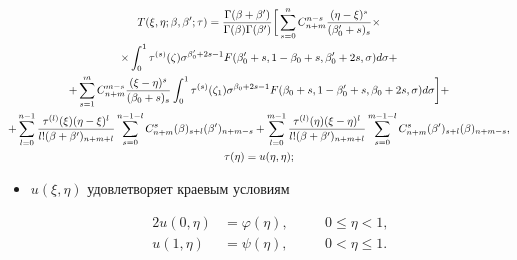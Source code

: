 \begin{gather} 


T(\xi,\eta;\beta,\beta';\tau)= 


\frac{\Gamma(\beta+\beta')}{\Gamma(\beta)\Gamma(\beta')}\bigg[ 


\sum^n_{s=0}C^{n-s}_{n+m}\frac{(\eta-\xi)^s}{(\beta'_0+s)_s} 


\times \notag \\ 


% 


\times\int^1_0 \tau^{(s)}(\zeta)\sigma^{\beta'_0+2s-1}F 


(\beta'_0+s,1-\beta_0+s,\beta'_0+2s,\sigma)d\sigma +\notag \\ 


% 


+\sum^m_{s=1}C^{m-s}_{n+m}\frac{(\xi-\eta)^s}{(\beta_0+s)_s} 


\int^1_0 \tau^{(s)}(\zeta_1)\sigma^{\beta_0+2s-1}F 


(\beta_0+s,1-\beta'_0+s,\beta_0+2s,\sigma)d\sigma\bigg] + \notag \\ 


% 


+\sum^{n-1}_{l=0}\frac{\tau^{(l)}(\xi)(\eta-\xi)^l} 


{l!(\beta+\beta')_{n+m+l}}\sum^{n-1-l}_{s=0} 


C^s_{n+m}(\beta)_{s+l}(\beta')_{n+m-s}+ 


\sum^{m-1}_{l=0}\frac{\tau^{(l)}(\eta)(\xi-\eta)^l} 


{l!(\beta+\beta')_{n+m+l}}\sum^{m-1-l}_{s=0} C^s_{n+m}


(\beta')_{s+l}(\beta)_{n+m-s},\notag \\ 


%


\tau(\eta)=u(\eta,\eta); 


\end{gather} 


\begin{itemize} 


\item[4)] $u(\xi,\eta)$ удовлетворяет краевым условиям 


\begin{alignat}{2} 


u(0,\eta)&=\varphi(\eta),&\quad &0\le\eta<1,\\ 


u(1,\eta)&=\psi(\eta),&\quad &0<\eta\le1. 


\end{alignat} 


\end{itemize} 


